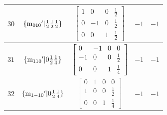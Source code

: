 \documentclass[fleqn,8pt]{jsarticle}
\begin{document}
\begin{longtable}{ccccc}
$ 30 $ & $ \{{\rm m}_{010}{}'|\frac{1}{2} \frac{1}{2} \frac{1}{2}\} $ & $ \begin{bmatrix} 1 & 0 & 0 & \frac{1}{2} \\ 0 & -1 & 0 & \frac{1}{2} \\ 0 & 0 & 1 & \frac{1}{2} \end{bmatrix} $ & $ -1 $ & $ -1 $ \\ \hline
$ 31 $ & $ \{{\rm m}_{110}{}'|0 \frac{1}{2} \frac{1}{4}\} $ & $ \begin{bmatrix} 0 & -1 & 0 & 0 \\ -1 & 0 & 0 & \frac{1}{2} \\ 0 & 0 & 1 & \frac{1}{4} \end{bmatrix} $ & $ -1 $ & $ -1 $ \\ \hline
$ 32 $ & $ \{{\rm m}_{1-10}{}'|0 \frac{1}{2} \frac{1}{4}\} $ & $ \begin{bmatrix} 0 & 1 & 0 & 0 \\ 1 & 0 & 0 & \frac{1}{2} \\ 0 & 0 & 1 & \frac{1}{4} \end{bmatrix} $ & $ -1 $ & $ -1 $ \\
\end{longtable}
\end{document}
